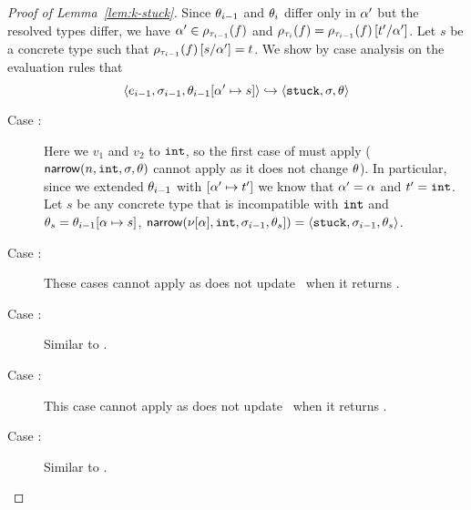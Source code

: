 \begin{proof}[Proof of Lemma~\ref{lem:k-stuck}]
  Since $\tsu_{i-1}$ and $\tsu_{i}$ differ only in $\thole'$ but the resolved
  types differ, we have
  $\thole' \in \ptype{\trace_{i-1}}{f}$
  and
  $\ptype{\trace_i}{f} = \ptype{\trace_{i-1}}{f}\sub{\thole'}{t'}$.
  Let $s$ be a
  concrete type such that $\ptype{\trace_{i-1}}{f}\sub{\thole'}{s} = t$.
  We show by case analysis on the evaluation rules that
  $$\step{e_{i-1}}{\vsu_{i-1}}{\tsu_{i-1}[\thole' \mapsto s]}{\stuck}{\vsu}{\tsu}$$
    \begin{description}
    \item[Case \replusgood:]
      Here we \forcesym $v_1$ and $v_2$ to $\tint$, so the first case of
      \forcesym must apply ($\force{n}{\tint}{\vsu}{\tsu}$ cannot apply
      as it does not change $\tsu$).
      In particular, since we extended $\tsu_{i-1}$ with
      $[\thole' \mapsto t']$ we know that $\thole' = \thole$ and
      $t' = \tint$.
      Let $s$ be any concrete type that is incompatible with $\tint$
      and $\tsu_s = \tsu_{i-1}[\thole \mapsto s]$,
      $\force{\vhole{\thole}}{\tint}{\vsu_{i-1}}{\tsu_s]} = \triple{\stuck}{\vsu_{i-1}}{\tsu_s}$.
    \item[Case :]
      These cases cannot apply as \forcesym does not update \tsu\ when
      it returns \stuck.
    \item[Case :]
      Similar to \replusgood.
    \item[Case \reifbad:]
      This case cannot apply as \forcesym does not update \tsu\ when
      it returns \stuck.
    \item[Case \reappgood:]
      Similar to \replusgood.

\end{description}
\end{proof}
